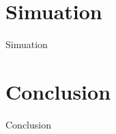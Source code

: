 \documentclass{bredelebeamer}
\begin{document}
\section{Simuation}
\begin{frame}{Simuation}

\end{frame}

\section{Conclusion}
\begin{frame}{Conclusion}

\end{frame}
\end{document}
